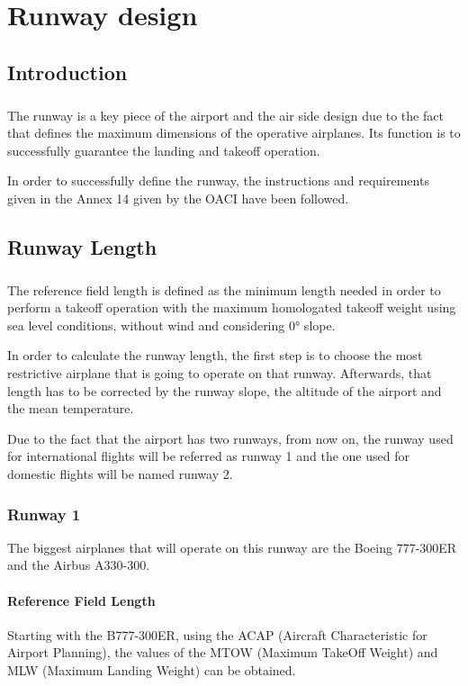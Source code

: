 \chapter{Runway design}

	\section{Introduction}
	\paragraph{} The runway is a key piece of the airport and the air side design due to the fact that defines the maximum dimensions of the operative airplanes. Its function is to successfully guarantee the landing and takeoff operation.
	
	In order to successfully define the runway, the instructions and requirements given in the Annex 14 given by the OACI have been followed. 

	\section{Runway Length}
	\paragraph{} The reference field length is defined as the minimum length needed in order to perform a takeoff operation with the maximum homologated takeoff weight using sea level conditions, without wind and considering 0° slope.  

	In order to calculate the runway length, the first step is to choose the most restrictive airplane that is going to operate on that runway. Afterwards, that length has to be corrected by the runway slope, the altitude of the airport and the mean temperature.

	Due to the fact that the airport has two runways, from now on, the runway used for international flights will be referred as runway 1 and the one used for domestic flights will be named runway 2. 
	
		\subsection{Runway 1}
		The biggest airplanes that will operate on this runway are the Boeing 777-300ER and the Airbus A330-300. 
		
			\subsubsection{Reference Field Length}
			Starting with the B777-300ER, using the ACAP (Aircraft Characteristic for Airport Planning), the values of the MTOW (Maximum TakeOff Weight) and MLW (Maximum Landing Weight) can be obtained. 
			
